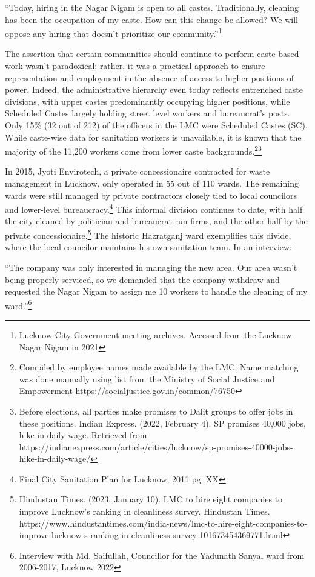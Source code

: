 ``Today, hiring in the Nagar Nigam is open to all castes. Traditionally, cleaning has been the occupation of my caste. How can this change be allowed? We will oppose any hiring that doesn't prioritize our community.''\footnote{Lucknow City Government meeting archives. Accessed from the Lucknow Nagar Nigam in 2021}

The assertion that certain communities should continue to perform caste-based work wasn't paradoxical; rather, it was a practical approach to ensure representation and employment in the absence of access to higher positions of power. Indeed, the administrative hierarchy even today reflects entrenched caste divisions, with upper castes predominantly occupying higher positions, while Scheduled Castes largely holding street level workers and bureaucrat's posts. Only 15\% (32 out of 212) of the officers in the LMC were Scheduled Castes (SC). While caste-wise data for sanitation workers is unavailable, it is known that the majority of the 11,200 workers come from lower caste backgrounds.\footnote{Compiled by employee names made available by the LMC. Name matching was done manually using list from the Ministry of Social Justice and Empowerment https://socialjustice.gov.in/common/76750}\footnote{Before elections, all parties make promises to Dalit groups to offer jobs in these positions. Indian Express. (2022, February 4). SP promises 40,000 jobs, hike in daily wage. Retrieved from https://indianexpress.com/article/cities/lucknow/sp-promises-40000-jobs-hike-in-daily-wage/}

In 2015, Jyoti Envirotech, a private concessionaire contracted for waste management in Lucknow, only operated in 55 out of 110 wards. The remaining wards were still managed by private contractors closely tied to local councilors and lower-level bureaucracy.\footnote{Final City Sanitation Plan for Lucknow, 2011 pg. XX} This informal division continues to date, with half the city cleaned by politician and bureaucrat-run firms, and the other half by the private concessionaire.\footnote{Hindustan Times. (2023, January 10). LMC to hire eight companies to improve Lucknow's ranking in cleanliness survey. Hindustan Times. https://www.hindustantimes.com/india-news/lmc-to-hire-eight-companies-to-improve-lucknow-s-ranking-in-cleanliness-survey-101673454369771.html} The historic Hazratganj ward exemplifies this divide, where the local councilor maintains his own sanitation team. In an interview:

``The company was only interested in managing the new area. Our area wasn't being properly serviced, so we demanded that the company withdraw and requested the Nagar Nigam to assign me 10 workers to handle the cleaning of my ward.''\footnote{Interview with Md. Saifullah, Councillor for the Yadunath Sanyal ward from 2006-2017, Lucknow 2022}

